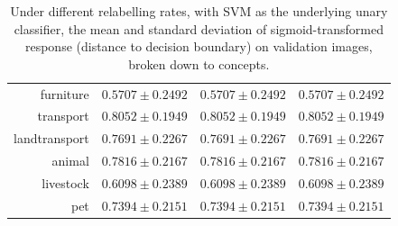 \documentclass[11pt,a4paper]{book}
\begin{document}
\begin{table}[htbp]
\begin{tabular}{r|c|c|c}
furniture     & $0.5707\pm0.2492$ & $0.5707\pm0.2492$ & $0.5707\pm0.2492$\\
transport     & $0.8052\pm0.1949$ & $0.8052\pm0.1949$ & $0.8052\pm0.1949$\\
landtransport & $0.7691\pm0.2267$ & $0.7691\pm0.2267$ & $0.7691\pm0.2267$\\
animal        & $0.7816\pm0.2167$ & $0.7816\pm0.2167$ & $0.7816\pm0.2167$\\
livestock     & $0.6098\pm0.2389$ & $0.6098\pm0.2389$ & $0.6098\pm0.2389$\\
pet           & $0.7394\pm0.2151$ & $0.7394\pm0.2151$ & $0.7394\pm0.2151$
\end{tabular}
\caption{Under different relabelling rates, with SVM as the underlying unary classifier, the mean and standard deviation of sigmoid-transformed response (distance to decision boundary) on validation images, broken down to concepts.}
\label{tab:svmresp}
\end{table}
\end{document}
